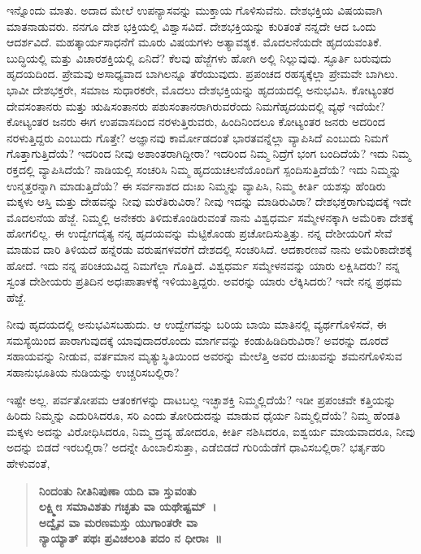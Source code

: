 ಇನ್ನೊಂದು ಮಾತು. ಅದಾದ ಮೇಲೆ ಉಪನ್ಯಾಸವನ್ನು ಮುಕ್ತಾಯ ಗೊಳಿಸುವೆನು. ದೇಶಭಕ್ತಿಯ ವಿಷಯವಾಗಿ ಮಾತನಾಡುವರು. ನನಗೂ ದೇಶ ಭಕ್ತಿಯಲ್ಲಿ ವಿಶ್ವಾಸವಿದೆ. ದೇಶಭಕ್ತಿಯನ್ನು ಕುರಿತಂತೆ ನನ್ನದೇ ಆದ ಒಂದು ಆದರ್ಶವಿದೆ. ಮಹತ್ಕಾರ್ಯಸಾಧನೆಗೆ ಮೂರು ವಿಷಯಗಳು ಅತ್ಯಾವಶ್ಯಕ. ಮೊದಲನೆಯದೇ ಹೃದಯವಂತಿಕೆ. ಬುದ್ಧಿಯಲ್ಲಿ ಮತ್ತು ವಿಚಾರಶಕ್ತಿಯಲ್ಲಿ ಏನಿದೆ? ಕೆಲವು ಹೆಜ್ಜೆಗಳು ಹೋಗಿ ಅಲ್ಲಿ ನಿಲ್ಲುವುವು. ಸ್ಫೂರ್ತಿ ಬರುವುದು ಹೃದಯದಿಂದ. ಪ್ರೇಮವು ಅಸಾಧ್ಯವಾದ ಬಾಗಿಲನ್ನೂ ತೆರೆಯುವುದು. ಪ್ರಪಂಚದ ರಹಸ್ಯಕ್ಕೆಲ್ಲಾ ಪ್ರೇಮವೇ ಬಾಗಿಲು. ಭಾವೀ ದೇಶಭಕ್ತರೇ, ಸಮಾಜ ಸುಧಾರಕರೇ, \break ಮೊದಲು ದೇಶಭಕ್ತಿಯನ್ನು ಹೃದಯದಲ್ಲಿ ಅನುಭವಿಸಿ. ಕೋಟ್ಯಂತರ ದೇವಸಂತಾನರು ಮತ್ತು ಋಷಿಸಂತಾನರು ಪಶುಸಂತಾನರಾಗಿರುವರೆಂದು ನಿಮಗೆ\break ಹೃದಯದಲ್ಲಿ ವ್ಯಥೆ ಇದೆಯೇ? ಕೋಟ್ಯಂತರ ಜನರು ಈಗ ಉಪವಾಸದಿಂದ ನರಳುತ್ತಿರುವರು, ಹಿಂದಿನಿಂದಲೂ ಕೋಟ್ಯಂತರ ಜನರು ಅದರಿಂದ ನರಳುತ್ತಿದ್ದರು ಎಂಬುದು ಗೊತ್ತೇ? ಅಜ್ಞಾನವು ಕಾರ್ಮೋಡದಂತೆ ಭಾರತವನ್ನೆಲ್ಲಾ ವ್ಯಾಪಿಸಿದೆ ಎಂಬುದು ನಿಮಗೆ ಗೊತ್ತಾಗುತ್ತಿದೆಯೆ? ಇದರಿಂದ ನೀವು ಅಶಾಂತರಾಗಿದ್ದೀರಾ? ಇದರಿಂದ ನಿಮ್ಮ ನಿದ್ರೆಗೆ ಭಂಗ ಬಂದಿದೆಯೆ? ಇದು ನಿಮ್ಮ ರಕ್ತದಲ್ಲಿ ವ್ಯಾಪಿಸಿದೆಯೆ? ನಾಡಿಯಲ್ಲಿ ಸಂಚರಿಸಿ ನಿಮ್ಮ ಹೃದಯಚಲನೆಯೊಂದಿಗೆ ಸ್ಪಂದಿಸುತ್ತಿದೆಯೆ? ಇದು ನಿಮ್ಮನ್ನು ಉನ್ಮತ್ತರನ್ನಾಗಿ ಮಾಡುತ್ತಿದೆಯೆ? ಈ ಸರ್ವನಾಶದ ದುಃಖ ನಿಮ್ಮನ್ನು ವ್ಯಾಪಿಸಿ, ನಿಮ್ಮ ಕೀರ್ತಿ ಯಶಸ್ಸು ಹೆಂಡಿರು ಮಕ್ಕಳು ಆಸ್ತಿ ಮತ್ತು ದೇಹವನ್ನು ನೀವು ಮರೆತಿರುವಿರಾ? ನೀವು ಇದನ್ನು ಮಾಡಿರುವಿರಾ? ದೇಶಭಕ್ತರಾಗುವುದಕ್ಕೆ ಇದೇ ಮೊದಲನೆಯ ಹೆಜ್ಜೆ. ನಿಮ್ಮಲ್ಲಿ ಅನೇಕರು ತಿಳಿದುಕೊಂಡಿರುವಂತೆ ನಾನು ವಿಶ್ವಧರ್ಮ ಸಮ್ಮೇಳನಕ್ಕಾಗಿ ಅಮೆರಿಕಾ ದೇಶಕ್ಕೆ ಹೋಗಲಿಲ್ಲ. ಈ ಉದ್ವೇಗದೈತ್ಯ ನನ್ನ ಹೃದಯವನ್ನು ಮೆಟ್ಟಿಕೊಂಡು ಪ್ರಚೋದಿಸುತ್ತಿತ್ತು. ನನ್ನ ದೇಶೀಯರಿಗೆ ಸೇವೆ ಮಾಡುವ ದಾರಿ ತಿಳಿಯದೆ ಹನ್ನೆರಡು ವರುಷಗಳವರೆಗೆ ದೇಶದಲ್ಲಿ ಸಂಚರಿಸಿದೆ. ಆದಕಾರಣವೆ ನಾನು ಅಮೆರಿಕಾದೇಶಕ್ಕೆ ಹೋದೆ. ಇದು ನನ್ನ ಪರಿಚಯವಿದ್ದ ನಿಮಗೆಲ್ಲಾ ಗೊತ್ತಿದೆ. ವಿಶ್ವಧರ್ಮ ಸಮ್ಮೇಳನವನ್ನು ಯಾರು ಲಕ್ಷಿಸಿದರು? ನನ್ನ ಸ್ವಂತ ದೇಶೀಯರು ಪ್ರತಿದಿನ ಅಧಃಪಾತಾಳಕ್ಕೆ ಇಳಿಯುತ್ತಿದ್ದರು. ಅವರನ್ನು ಯಾರು ಲೆಕ್ಕಿಸಿದರು? ಇದೇ ನನ್ನ ಪ್ರಥಮ ಹೆಜ್ಜೆ.

ನೀವು ಹೃದಯದಲ್ಲಿ ಅನುಭವಿಸಬಹುದು. ಆ ಉದ್ವೇಗವನ್ನು ಬರಿಯ ಬಾಯಿ ಮಾತಿನಲ್ಲಿ ವ್ಯರ್ಥಗೊಳಿಸದೆ, ಈ ಸಮಸ್ಯೆಯಿಂದ ಪಾರಾಗುವುದಕ್ಕೆ ಯಾವುದಾದರೊಂದು ಮಾರ್ಗವನ್ನು ಕಂಡುಹಿಡಿದಿರುವಿರಾ? ಅವರನ್ನು ದೂರದೆ ಸಹಾಯವನ್ನು ನೀಡುವ, ವರ್ತಮಾನ ಮೃತ್ಯುಸ್ಥಿತಿಯಿಂದ ಅವರನ್ನು ಮೇಲೆತ್ತಿ ಅವರ ದುಃಖವನ್ನು ಶಮನಗೊಳಿಸುವ ಸಹಾನುಭೂತಿಯ ನುಡಿಯನ್ನು ಉಚ್ಚರಿಸಬಲ್ಲಿರಾ?

ಇಷ್ಟೇ ಅಲ್ಲ. ಪರ್ವತೋಪಮ ಆತಂಕಗಳನ್ನು ದಾಟಬಲ್ಲ ಇಚ್ಛಾಶಕ್ತಿ ನಿಮ್ಮಲ್ಲಿದೆಯೆ? ಇಡೀ ಪ್ರಪಂಚವೇ ಕತ್ತಿಯನ್ನು ಹಿರಿದು ನಿಮ್ಮನ್ನು ಎದುರಿಸಿದರೂ, ಸರಿ ಎಂದು ತೋರಿದುದನ್ನು ಮಾಡುವ ಧೈರ್ಯ ನಿಮ್ಮಲ್ಲಿದೆಯೆ? ನಿಮ್ಮ ಹೆಂಡತಿ ಮಕ್ಕಳು ಅದನ್ನು ವಿರೋಧಿಸಿದರೂ, ನಿಮ್ಮ ದ್ರವ್ಯ ಹೋದರೂ, ಕೀರ್ತಿ ನಶಿಸಿದರೂ, ಐಶ್ವರ್ಯ ಮಾಯವಾದರೂ, ನೀವು ಅದನ್ನು ಬಿಡದೆ ಇರಬಲ್ಲಿರಾ? ಅದನ್ನೇ ಹಿಂಬಾಲಿಸುತ್ತಾ, ಎಡೆಬಿಡದೆ ಗುರಿಯೆಡೆಗೆ ಧಾವಿಸಬಲ್ಲಿರಾ? ಭರ್ತೃಹರಿ ಹೇಳುವಂತೆ,

\begin{verse}
\textbf{ನಿಂದಂತು ನೀತಿನಿಪುಣಾ ಯದಿ ವಾ ಸ್ತುವಂತು}\\\textbf{ಲಕ್ಷ್ಮೀಃ ಸಮಾವಿಶತು ಗಚ್ಛತು ವಾ ಯಥೇಷ್ಟಮ್​~।}\\\textbf{ಅದ್ವೈವ ವಾ ಮರಣಮಸ್ತು ಯುಗಾಂತರೇ ವಾ}\\\textbf{ನ್ಯಾಯ್ಯಾತ್​ ಪಥಃ ಪ್ರವಿಚಲಂತಿ ಪದಂ ನ ಧೀರಾಃ~॥}
\end{verse}

